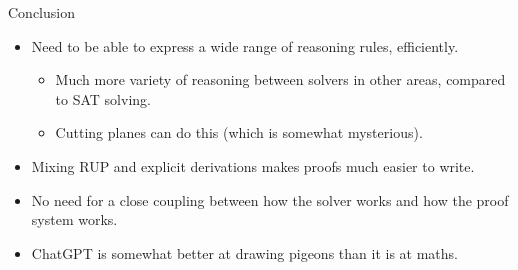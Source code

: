 \documentclass[aspectratio=169,compress,10pt]{beamer}
\begin{document}
\begin{frame}{Conclusion}
    \begin{minipage}[t]{0.7\paperwidth}
\begin{itemize}
    \item Need to be able to express a wide range of reasoning rules, efficiently.
        \begin{itemize}
            \item Much more variety of reasoning between solvers in other areas, compared to SAT
                solving.
            \item Cutting planes can do this (which is somewhat mysterious).
        \end{itemize}
    \item Mixing RUP and explicit derivations makes proofs much easier to write.
    \item No need for a close coupling between how the solver works and how the proof system
        works.
    \item <2-> ChatGPT is somewhat better at drawing pigeons than it is at maths.
\end{itemize}%
\end{minipage}%
\end{frame}
\end{document}
